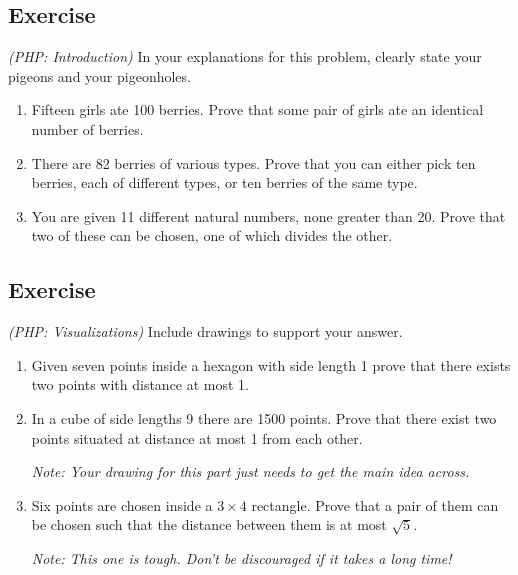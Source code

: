 \documentclass{article}
\newcounter{counter}
\newcommand{\Exercise}{Exercise \stepcounter{counter}\thecounter}
\begin{document}
\subsection*{\Exercise}
    \textit{(PHP: Introduction)} In your explanations for this problem, clearly state your pigeons and your pigeonholes.
    \begin{enumerate}
        \item Fifteen girls ate 100 berries. Prove that some pair of girls ate an identical number of berries.
        \item There are 82 berries of various types. Prove that you can either pick ten berries, each of different types, or ten berries of the same type.
        \item You are given 11 different natural numbers, none greater than 20. Prove that two of these can be chosen, one of which divides the other.
    \end{enumerate}

\subsection*{\Exercise}
    \textit{(PHP: Visualizations) } Include drawings to support your answer.
    \begin{enumerate}
        \item Given seven points inside a hexagon with side length 1 prove that there exists two points with distance at most 1. 
        \item In a cube of side lengths 9 there are 1500 points. Prove that there exist two points situated at distance at most 1 from each other.
        
        \vspace{1mm} \textit{Note: Your drawing for this part just needs to get the main idea across.}
        \item Six points are chosen inside a $3 \times 4$ rectangle. Prove that a pair of them can be chosen such that the distance between them is at most $\sqrt{5}$.
        
        \vspace{1mm} \textit{Note: This one is tough. Don't be discouraged if it takes a long time!}
    \end{enumerate}
\end{document}
